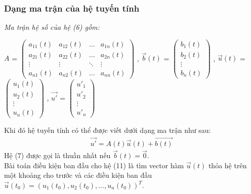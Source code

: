 \subsubsection{Dạng ma trận của hệ tuyến tính}
\textit{Ma trận hệ số của hệ (6) gồm:}
\begin{center}
    $A$ = 
    $\begin{pmatrix}
        a_{11}(t) & a_{12}(t) & \dots & a_{1n}(t)\\
        a_{21}(t) & a_{22}(t) & \dots & a_{2n}(t)\\
        \vdots    & \vdots    & \ddots & \vdots\\
        a_{n1}(t) & a_{n2}(t) & \dots & a_{nn}(t)
    \end{pmatrix}$
    ,
    $\Vec{b}(t)$ = 
    $\begin{pmatrix}
        b_1(t)\\
        b_2(t)\\
        \vdots\\
        b_n(t)
    \end{pmatrix}$
    ,
    $\Vec{u}(t)$ = 
    $\begin{pmatrix}
        u_1(t)\\
        u_2(t)\\
        \vdots\\
        u_n(t)
    \end{pmatrix}$
    ,
    $\Vec{u'}$ = 
    $\begin{pmatrix}
        u'_1\\
        u'_2\\
        \vdots\\
        u'_n
    \end{pmatrix}$
\end{center}
Khi đó hệ tuyến tính có thể được viết dưới dạng ma trận như sau:
\begin{align}
    \Vec{u'} = A(t)\Vec{u}(t) + \Vec{b(t)}
\end{align}
Hệ (7) được gọi là thuần nhất nếu $\Vec{b}(t) = \Vec{0}$.\\
Bài toán điều kiện ban đầu cho hệ (11) là tìm vector hàm $\Vec{u}(t)$ thỏa hệ trên một khoảng cho trước và các điều kiện ban đầu $\Vec{u}(t_0) = (u_1(t_0), u_2(t_0),...,u_n(t_0))^T$.
